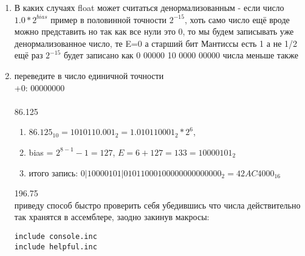 \documentclass[a4paper,10pt]{article}
\begin{document}
\begin{enumerate}
    \item В каких случаях float может считаться денормализованным - если число $1.0*2^{bias}$ пример в половинной точности $2^{-15}$, хоть само число ещё вроде можно представить но так как все нули это 0, то мы будем записывать уже денормализованное число, те E=0 а старший бит Мантиссы есть 1 а не 1/2 \\
    ещё раз $2^{-15}$ будет записано как 0 00000 10 0000 00000 числа меньше также \\
    \item переведите в число единичной точности\\
    +0: 00000000 \\ 
    \\
    86.125 \\
    \begin{enumerate}
        \item $86.125_10 = 1010110.001_2=1.010110001_2*2^6$,
        \item bias = $2^{8-1}-1 = 127$, $E=6+127=133=10000101_2$
        \item итого запись: $0|1000 0101| 0101 1000 1000 0000 0000 000_2 = 42AC4000_{16}$
    \end{enumerate}
    196.75 \\
    приведу способ быстро проверить себя убедившись что числа действительно так хранятся в ассемблере, заодно закинув макросы:
\begin{verbatim}
include console.inc
include helpful.inc


\end{verbatim}
\end{enumerate}
\end{document}
